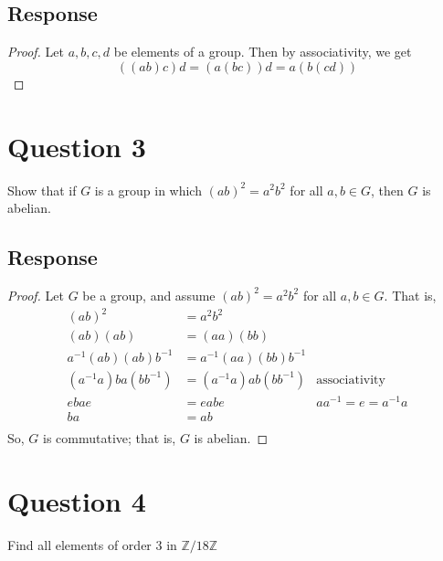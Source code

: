\documentclass[13pt]{article}
\begin{document}
\subsection*{Response}
\begin{proof}
  Let $a, b, c, d$ be elements of a group. Then by associativity, we get
  \[((ab)c)d = (a(bc))d = a(b(cd))\]
\end{proof}





\newpage
\section*{Question 3}
Show that if $G$ is a group in which $(ab)^2 = a^2b^2$ for all $a, b \in G$, then $G$ is abelian.

\subsection*{Response}
\begin{proof}
  Let $G$ be a group, and assume $(ab)^2 = a^2b^2$ for all $a, b \in G$. That is,
  \begin{align*}
    (ab)^2 &= a^2b^2 \\
    (ab)(ab) &= (aa)(bb) \\
    a^{-1}(ab)(ab)b^{-1} &= a^{-1}(aa)(bb)b^{-1} \\
    (a^{-1}a)ba(bb^{-1}) &= (a^{-1}a)ab(bb^{-1}) & \text{associativity} \\
    ebae &= eabe & aa^{-1} = e = a^{-1}a \\
    ba &= ab \\
  \end{align*}
  So, $G$ is commutative; that is, $G$ is abelian.
\end{proof}




\newpage
\section*{Question 4}
Find all elements of order 3 in $\mathbb{Z}/18\mathbb{Z}$
\end{document}
